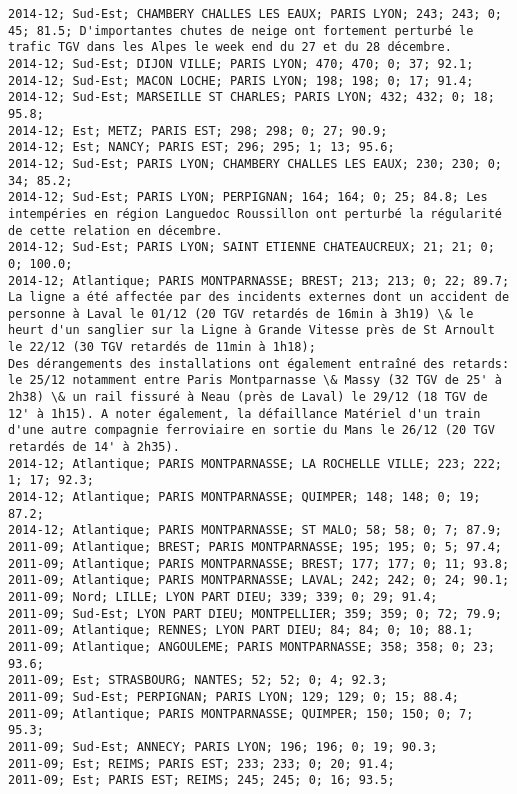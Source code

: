 \documentclass{article}
\begin{document}
\begin{Verbatim}[commandchars=\\\{\}]
2014-12; Sud-Est; CHAMBERY CHALLES LES EAUX; PARIS LYON; 243; 243; 0; 45; 81.5; D'importantes chutes de neige ont fortement perturbé le trafic TGV dans les Alpes le week end du 27 et du 28 décembre.
2014-12; Sud-Est; DIJON VILLE; PARIS LYON; 470; 470; 0; 37; 92.1; 
2014-12; Sud-Est; MACON LOCHE; PARIS LYON; 198; 198; 0; 17; 91.4; 
2014-12; Sud-Est; MARSEILLE ST CHARLES; PARIS LYON; 432; 432; 0; 18; 95.8; 
2014-12; Est; METZ; PARIS EST; 298; 298; 0; 27; 90.9; 
2014-12; Est; NANCY; PARIS EST; 296; 295; 1; 13; 95.6; 
2014-12; Sud-Est; PARIS LYON; CHAMBERY CHALLES LES EAUX; 230; 230; 0; 34; 85.2; 
2014-12; Sud-Est; PARIS LYON; PERPIGNAN; 164; 164; 0; 25; 84.8; Les intempéries en région Languedoc Roussillon ont perturbé la régularité de cette relation en décembre.
2014-12; Sud-Est; PARIS LYON; SAINT ETIENNE CHATEAUCREUX; 21; 21; 0; 0; 100.0; 
2014-12; Atlantique; PARIS MONTPARNASSE; BREST; 213; 213; 0; 22; 89.7; La ligne a été affectée par des incidents externes dont un accident de personne à Laval le 01/12 (20 TGV retardés de 16min à 3h19) \& le heurt d'un sanglier sur la Ligne à Grande Vitesse près de St Arnoult le 22/12 (30 TGV retardés de 11min à 1h18);
Des dérangements des installations ont également entraîné des retards: le 25/12 notamment entre Paris Montparnasse \& Massy (32 TGV de 25' à 2h38) \& un rail fissuré à Neau (près de Laval) le 29/12 (18 TGV de 12' à 1h15). A noter également, la défaillance Matériel d'un train d'une autre compagnie ferroviaire en sortie du Mans le 26/12 (20 TGV retardés de 14' à 2h35). 
2014-12; Atlantique; PARIS MONTPARNASSE; LA ROCHELLE VILLE; 223; 222; 1; 17; 92.3; 
2014-12; Atlantique; PARIS MONTPARNASSE; QUIMPER; 148; 148; 0; 19; 87.2; 
2014-12; Atlantique; PARIS MONTPARNASSE; ST MALO; 58; 58; 0; 7; 87.9; 
2011-09; Atlantique; BREST; PARIS MONTPARNASSE; 195; 195; 0; 5; 97.4; 
2011-09; Atlantique; PARIS MONTPARNASSE; BREST; 177; 177; 0; 11; 93.8; 
2011-09; Atlantique; PARIS MONTPARNASSE; LAVAL; 242; 242; 0; 24; 90.1; 
2011-09; Nord; LILLE; LYON PART DIEU; 339; 339; 0; 29; 91.4; 
2011-09; Sud-Est; LYON PART DIEU; MONTPELLIER; 359; 359; 0; 72; 79.9; 
2011-09; Atlantique; RENNES; LYON PART DIEU; 84; 84; 0; 10; 88.1; 
2011-09; Atlantique; ANGOULEME; PARIS MONTPARNASSE; 358; 358; 0; 23; 93.6; 
2011-09; Est; STRASBOURG; NANTES; 52; 52; 0; 4; 92.3; 
2011-09; Sud-Est; PERPIGNAN; PARIS LYON; 129; 129; 0; 15; 88.4; 
2011-09; Atlantique; PARIS MONTPARNASSE; QUIMPER; 150; 150; 0; 7; 95.3; 
2011-09; Sud-Est; ANNECY; PARIS LYON; 196; 196; 0; 19; 90.3; 
2011-09; Est; REIMS; PARIS EST; 233; 233; 0; 20; 91.4; 
2011-09; Est; PARIS EST; REIMS; 245; 245; 0; 16; 93.5; 

\end{Verbatim}
\end{document}
